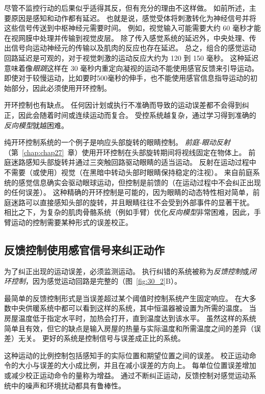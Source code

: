 尽管不监控行动的后果似乎适得其反，但有充分的理由不这样做。
如前所述，主要原因是感知和动作都有延迟。
也就是说，感觉受体将刺激转化为神经信号并将这些信号传送到中枢神经元需要时间。
例如，视觉输入可能需要大约 60 毫秒才能在视网膜中处理并传输到视觉皮层。
除了传入感觉系统的延迟外，中央处理、传出信号向运动神经元的传输以及肌肉的反应也存在延迟。
总之，组合的感觉运动回路延迟是可观的，对于视觉刺激的运动反应大约为 120 到 150 毫秒。
这种延迟意味着像\textit{眼跳}这样在 30 毫秒内重定向凝视的运动不能使用感官反馈来引导运动。
即使对于较慢运动，比如要时500毫秒的伸手，也不能使用感官信息指导运动的初始部分，因此必须使用开环控制。


开环控制也有缺点。
任何因计划或执行不准确而导致的运动误差都不会得到纠正，因此会随着时间或连续运动而复合。
受控系统越复杂，通过学习得到准确的\textit{反向模型}就越困难。


纯开环控制系统的一个例子是响应头部旋转的眼睛控制。
\textit{前庭-眼动反射}（第~\ref{chap:chap27}~章）使用开环控制在头部旋转期间将视线固定在物体上。
前庭迷路感知头部旋转并通过三突触回路驱动眼睛的适当运动。
反射在运动过程中不需要（或使用）视觉（在黑暗中转动头部时眼睛保持稳定的注视）。
来自前庭系统的感觉信息确实会驱动眼球运动，但控制是前馈的（在运动过程中不会纠正出现的任何误差）。
这种精确的开环控制是可能的，因为眼睛的动态特性相对简单，前庭迷路可以直接感知头部的旋转，并且眼睛往往不会受到外部事件的显著干扰。
相比之下，为复杂的肌肉骨骼系统（例如手臂）优化\textit{反向模型}非常困难，因此，手臂运动的控制需要某种形式的误差校正。



\subsection{反馈控制使用感官信号来纠正动作}

为了纠正出现的运动误差，必须监测运动。
执行纠错的系统被称为\textit{反馈控制}或\textit{闭环控制}，因为感觉运动回路是完整的（图~\ref{fig:30_2}B）。


最简单的反馈控制形式是当误差超过某个阈值时控制系统产生固定响应。
在大多数中央供暖系统中都可以看到这样的系统，其中恒温器被设置为所需的温度。
当房屋温度低于指定水平时，加热会打开，直到温度达到该水平。
虽然这样的系统简单且有效，但它的缺点是输入房屋的热量与实际温度和所需温度之间的差异（误差）无关。
更好的系统是控制信号与误差成正比的系统。


这种运动的比例控制包括感知手的实际位置和期望位置之间的误差。
校正运动命令的大小与误差的大小成比例，并且在减小误差的方向上。
每单位位置误差增加或减少校正运动命令的量称为增益。
通过不断纠正运动，反馈控制对感觉运动系统中的噪声和环境扰动都具有鲁棒性。



